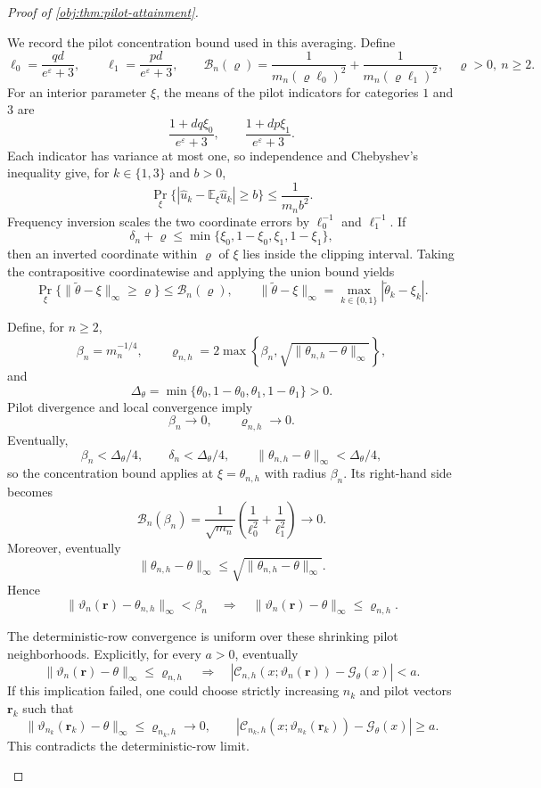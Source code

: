 \begin{proof}[Proof of \cref{obj:thm:pilot-attainment}]
\begin{enumerate}
We record the pilot concentration bound used in this averaging. Define
\[
\ell_0=\frac{qd}{e^\varepsilon+3},
\qquad
\ell_1=\frac{pd}{e^\varepsilon+3},
\qquad
\mathcal B_n(\varrho)
=
\frac1{m_n(\varrho\ell_0)^2}
+\frac1{m_n(\varrho\ell_1)^2},
\quad \varrho>0,\ n\ge2.
\]
For an interior parameter \(\xi\), the means of the pilot indicators for categories \(1\) and \(3\) are
\[
\frac{1+dq\xi_0}{e^\varepsilon+3},
\qquad
\frac{1+dp\xi_1}{e^\varepsilon+3}.
\]
Each indicator has variance at most one, so independence and Chebyshev's inequality give, for \(k\in\{1,3\}\) and \(b>0\),
\[
\Pr_\xi\{|\widehat u_k-\mathbb E_\xi\widehat u_k|\ge b\}
\le\frac1{m_nb^2}.
\]
Frequency inversion scales the two coordinate errors by
\(\ell_0^{-1}\) and \(\ell_1^{-1}\). If
\[
\delta_n+\varrho\le
\min\{\xi_0,1-\xi_0,\xi_1,1-\xi_1\},
\]
then an inverted coordinate within \(\varrho\) of \(\xi\) lies inside the clipping interval. Taking the contrapositive coordinatewise and applying the union bound yields
\[
\Pr_\xi\{\|\widetilde\theta-\xi\|_\infty\ge\varrho\}
\le\mathcal B_n(\varrho),
\qquad
\|\widetilde\theta-\xi\|_\infty
=\max_{k\in\{0,1\}}|\widetilde\theta_k-\xi_k|.
\]

Define, for \(n\ge2\),
\[
\beta_n=m_n^{-1/4},
\qquad
\varrho_{n,h}
=
2\max\left\{
\beta_n,\sqrt{\|\theta_{n,h}-\theta\|_\infty}
\right\},
\]
and
\[
\Delta_\theta
=\min\{\theta_0,1-\theta_0,\theta_1,1-\theta_1\}>0.
\]
Pilot divergence and local convergence imply
\[
\beta_n\to0,\qquad \varrho_{n,h}\to0.
\]
Eventually,
\[
\beta_n<\Delta_\theta/4,\qquad
\delta_n<\Delta_\theta/4,\qquad
\|\theta_{n,h}-\theta\|_\infty<\Delta_\theta/4,
\]
so the concentration bound applies at \(\xi=\theta_{n,h}\) with radius \(\beta_n\). Its right-hand side becomes
\[
\mathcal B_n(\beta_n)
=
\frac1{\sqrt{m_n}}
\left(\frac1{\ell_0^2}+\frac1{\ell_1^2}\right)
\longrightarrow0.
\]
Moreover, eventually
\[
\|\theta_{n,h}-\theta\|_\infty
\le\sqrt{\|\theta_{n,h}-\theta\|_\infty}.
\]
Hence
\[
\|\vartheta_n(\mathbf r)-\theta_{n,h}\|_\infty<\beta_n
\quad\Longrightarrow\quad
\|\vartheta_n(\mathbf r)-\theta\|_\infty\le\varrho_{n,h}.
\]

The deterministic-row convergence is uniform over these shrinking pilot neighborhoods. Explicitly, for every \(a>0\), eventually
\[
\|\vartheta_n(\mathbf r)-\theta\|_\infty\le\varrho_{n,h}
\quad\Longrightarrow\quad
|\mathcal C_{n,h}(x;\vartheta_n(\mathbf r))
-\mathcal G_\theta(x)|<a.
\]
If this implication failed, one could choose strictly increasing \(n_k\) and pilot vectors \(\mathbf r_k\) such that
\[
\|\vartheta_{n_k}(\mathbf r_k)-\theta\|_\infty
\le\varrho_{n_k,h}\longrightarrow0,
\qquad
|\mathcal C_{n_k,h}(x;\vartheta_{n_k}(\mathbf r_k))
-\mathcal G_\theta(x)|\ge a.
\]
This contradicts the deterministic-row limit.


\end{enumerate}
\end{proof}
